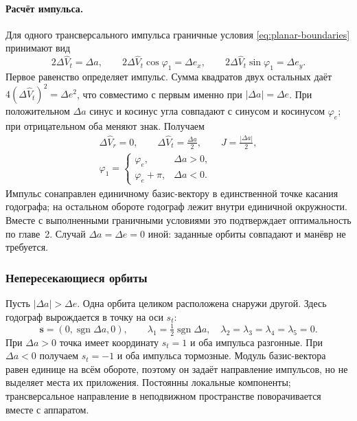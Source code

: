 \paragraph{Расчёт импульса.}
Для одного трансверсального импульса граничные условия
\eqref{eq:planar-boundaries} принимают вид
\[
 2\Delta\widehat V_t=\Delta a,\qquad
 2\Delta\widehat V_t\cos\varphi_1=\Delta e_x,\qquad
 2\Delta\widehat V_t\sin\varphi_1=\Delta e_y.
\]
Первое равенство определяет импульс. Сумма квадратов двух остальных
даёт $4(\Delta\widehat V_t)^2=\Delta e^2$, что совместимо с первым
именно при $|\Delta a|=\Delta e$. При положительном $\Delta a$
синус и косинус угла совпадают с синусом и косинусом $\varphi_e$;
при отрицательном оба меняют знак. Получаем
\begin{equation}
 \boxed{\begin{gathered}
 \Delta\widehat V_r=0,\qquad
 \Delta\widehat V_t=\frac{\Delta a}{2},\qquad J=\frac{|\Delta a|}{2},\\
 \varphi_1=\begin{cases}\varphi_e,&\Delta a>0,\\
                         \varphi_e+\pi,&\Delta a<0.
            \end{cases}
 \end{gathered}}
 \label{eq:planar-tangent-impulse}
\end{equation}
Импульс сонаправлен единичному базис-вектору в единственной точке
касания годографа; на остальном обороте годограф лежит внутри
единичной окружности. Вместе с выполненными граничными условиями
это подтверждает оптимальность по главе~2.
Случай $\Delta a=\Delta e=0$ иной: заданные орбиты совпадают
и манёвр не требуется.


\subsubsection{Непересекающиеся орбиты}
\label{sec:planar-disjoint}

Пусть $|\Delta a|>\Delta e$. Одна орбита целиком расположена
снаружи другой. Здесь годограф вырождается в точку
на оси $s_t$:
\begin{equation}
 \boldsymbol s=(0,\operatorname{sgn}\Delta a,0),\qquad
 \lambda_1=\tfrac12\operatorname{sgn}\Delta a,\quad
 \lambda_2=\lambda_3=\lambda_4=\lambda_5=0.
 \label{eq:planar-point-primer}
\end{equation}
При $\Delta a>0$ точка имеет координату $s_t=1$ и оба импульса
разгонные. При $\Delta a<0$ получаем $s_t=-1$ и оба импульса тормозные.
Модуль базис-вектора равен единице на всём обороте, поэтому он
задаёт направление импульсов, но не выделяет места их приложения.
Постоянны локальные компоненты; трансверсальное направление
в неподвижном пространстве поворачивается вместе с аппаратом.

